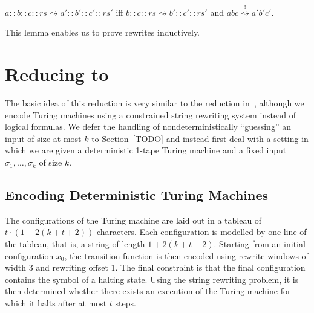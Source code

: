 \documentclass[a4paper,UKenglish,cleveref, autoref]{lipics-v2019}
\newcommand{\strent}{\rightsquigarrow}
\newcommand{\constrent}{\overset{!}{\rightsquigarrow}}
\begin{document}
\begin{lemma}\label{lem:rewind}
  $a :: b :: c :: rs \strent{} a' :: b' :: c' :: rs'$ iff $b :: c :: rs \strent{} b' :: c' :: rs'$ and $abc \constrent{} a'b'c'$. 
\end{lemma}
This lemma enables us to prove rewrites inductively.

\section{Reducing \gennp{} to \strconrew{}}
The basic idea of this reduction is very similar to the reduction in~\cite{Sipser:TheoryofComputation}, although we encode Turing machines using a constrained string rewriting system instead of logical formulas. We defer the handling of nondeterministically ``guessing'' an input of size at most $k$ to Section~\ref{TODO} and instead first deal with a setting in which we are given a deterministic 1-tape Turing machine and a fixed input $\sigma_1, \ldots, \sigma_k$ of size $k$. 

\subsection{Encoding Deterministic Turing Machines}
The configurations of the Turing machine are laid out in a tableau of $t \cdot (1 + 2(k + t + 2))$ characters. Each configuration is modelled by one line of the tableau, that is, a string of length $1 + 2(k + t + 2)$. Starting from an initial configuration $x_0$, the transition function is then encoded using rewrite windows of width 3 and rewriting offset 1. The final constraint is that the final configuration contains the symbol of a halting state. 
Using the string rewriting problem, it is then determined whether there exists an execution of the Turing machine for which it halts after at most $t$ steps. 
\end{document}
